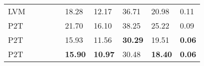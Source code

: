 \documentclass[journal]{IEEEtran}
\begin{document}
\begin{table*}[]
\begin{tabularx}{0.9\textwidth}{l|YYYY|YYYYY}
LVM                    &                      &                                                                          &                                                                                 &                                                                             & 18.28         & 12.17         & 36.71       & 20.98      & 0.11                                                                                                                                          \\
P2T                  &                      &                                                                      &                                                                             &                                                                                & 21.70         & 16.10          & 38.25       & 25.22   & 0.09                                                                                                                                          \\
P2T                 &                      &                                                                          &                                                                             &                                                                             & 15.93         & 11.56         & \textbf{30.29}       & 19.51      & \textbf{0.06}                                                                                                                                          \\
P2T                &                      &                                                                      &                                                                             &                                                                             & \textbf{15.90}         & \textbf{10.97}         & 30.48       & \textbf{18.40}      & \textbf{0.06}                                                                                                                                        \\ \bottomrule
\end{tabularx}
\label{tab:abl_sdd}
\end{table*}
\end{document}
